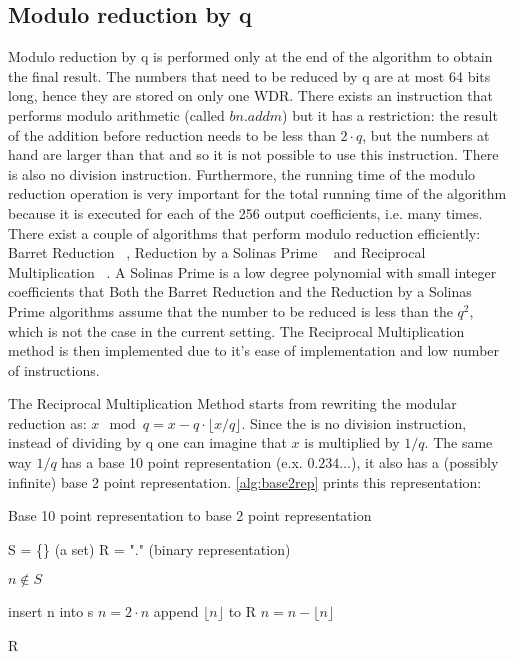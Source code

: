 \subsection{Modulo reduction by q}

Modulo reduction by q is performed only at the end of the algorithm to obtain the final result. The numbers that need to be reduced by q are at most 64 bits long, hence they are stored on only one WDR. There exists an instruction that performs modulo arithmetic (called $bn.addm$) but it has a restriction: the result of the addition before reduction needs to be less than $2 \cdot q$, but the numbers at hand are larger than that and so it is not possible to use this instruction. There is also no division instruction. Furthermore, the running time of the modulo reduction operation is very important for the total running time of the algorithm because it is executed for each of the 256 output coefficients, i.e. many times. There exist a couple of algorithms that perform modulo reduction efficiently: Barret Reduction ~\parencite{4272869}, Reduction by a Solinas Prime ~\parencite{Solinas2011} and Reciprocal Multiplication ~\parencite{reciprocal}. A Solinas Prime is a low degree polynomial with small integer coefficients that   Both the Barret Reduction and the Reduction by a Solinas Prime algorithms assume that the number to be reduced is less than the $q^2$, which is not the case in the current setting. The Reciprocal Multiplication method is then implemented due to it's ease of implementation and low number of instructions.

The Reciprocal Multiplication Method starts from rewriting the modular reduction as: $x \mod q = x - q \cdot \lfloor x / q \rfloor$. Since the is no division instruction, instead of dividing by q one can imagine that $x$ is multiplied by $1/q$. The same way $1/q$ has a base 10 point representation (e.x. $0.234\ldots$), it also has a (possibly infinite) base 2 point representation. \cref{alg:base2rep} prints this representation:

\begin{algorithm}
  \caption{Base 10 point representation to base 2 point representation}
  \label{alg:base2rep}
  \begin{algorithmic}[1]
  

      \State S = \{\} (a set)
      \State R = "." (binary representation)

      \While $n \notin S$

        \State insert n into s
        \State $n = 2 \cdot n$
        \State append $\lfloor n \rfloor$ to R
        \State $n = n - \lfloor n \rfloor$

      \EndWhile

      \Return R
  
  \EndProcedure
  
  \end{algorithmic}
\end{algorithm}

